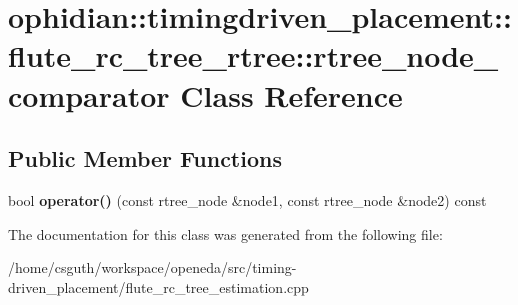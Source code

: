 \hypertarget{classophidian_1_1timingdriven__placement_1_1flute__rc__tree__rtree_1_1rtree__node__comparator}{\section{ophidian\-:\-:timingdriven\-\_\-placement\-:\-:flute\-\_\-rc\-\_\-tree\-\_\-rtree\-:\-:rtree\-\_\-node\-\_\-comparator Class Reference}
\label{classophidian_1_1timingdriven__placement_1_1flute__rc__tree__rtree_1_1rtree__node__comparator}
}
\subsection*{Public Member Functions}
\begin{DoxyCompactItemize}
\item 
\hypertarget{classophidian_1_1timingdriven__placement_1_1flute__rc__tree__rtree_1_1rtree__node__comparator_a1fb8b85507617390a63ae8be20a4c706}{bool {\bfseries operator()} (const rtree\-\_\-node \&node1, const rtree\-\_\-node \&node2) const }\label{classophidian_1_1timingdriven__placement_1_1flute__rc__tree__rtree_1_1rtree__node__comparator_a1fb8b85507617390a63ae8be20a4c706}

\end{DoxyCompactItemize}


The documentation for this class was generated from the following file\-:\begin{DoxyCompactItemize}
\item 
/home/csguth/workspace/openeda/src/timing-\/driven\-\_\-placement/flute\-\_\-rc\-\_\-tree\-\_\-estimation.\-cpp\end{DoxyCompactItemize}
